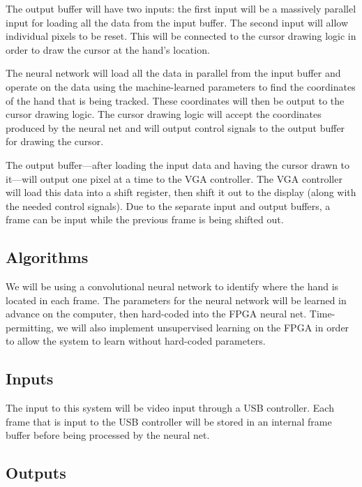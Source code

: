 \documentclass[12pt]{article}
\begin{document}
The output buffer will have two inputs: the first input will be a massively
parallel input for loading all the data from the input buffer. The second input
will allow individual pixels to be reset. This will be connected to the cursor
drawing logic in order to draw the cursor at the hand's location.

The neural network will load all the data in parallel from the input buffer and
operate on the data using the machine-learned parameters to find the coordinates
of the hand that is being tracked. These coordinates will then be output to the
cursor drawing logic. The cursor drawing logic will accept the coordinates
produced by the neural net and will output control signals to the output buffer
for drawing the cursor.

The output buffer---after loading the input data and having the cursor drawn to
it---will output one pixel at a time to the VGA controller. The VGA controller
will load this data into a shift register, then shift it out to the display
(along with the needed control signals). Due to the separate input and output
buffers, a frame can be input while the previous frame is being shifted out.

\subsection{Algorithms}
\label{sub:algorithms}

We will be using a convolutional neural network to identify where the hand is
located in each frame. The parameters for the neural network will be learned in
advance on the computer, then hard-coded into the FPGA neural net.
Time-permitting, we will also implement unsupervised learning on the FPGA in
order to allow the system to learn without hard-coded parameters.

\subsection{Inputs}
\label{sub:inputs}

The input to this system will be video input through a USB controller. Each
frame that is input to the USB controller will be stored in an internal frame
buffer before being processed by the neural net.

\subsection{Outputs}
\label{sub:outputs}
\end{document}
